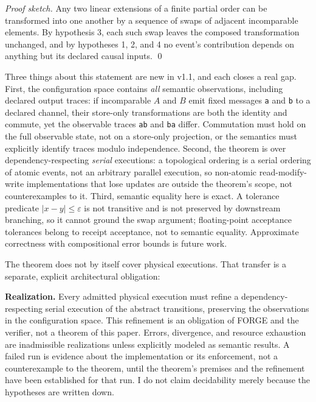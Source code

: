 \documentclass[11pt]{article}
\begin{document}
\textit{Proof sketch.} Any two linear extensions of a finite partial order can be transformed into one another by a sequence of swaps of adjacent incomparable elements. By hypothesis 3, each such swap leaves the composed transformation unchanged, and by hypotheses 1, 2, and 4 no event's contribution depends on anything but its declared causal inputs. \qed

Three things about this statement are new in v1.1, and each closes a real gap. First, the configuration space contains \textit{all} semantic observations, including declared output traces: if incomparable $A$ and $B$ emit fixed messages \texttt{a} and \texttt{b} to a declared channel, their store-only transformations are both the identity and commute, yet the observable traces \texttt{ab} and \texttt{ba} differ. Commutation must hold on the full observable state, not on a store-only projection, or the semantics must explicitly identify traces modulo independence. Second, the theorem is over dependency-respecting \textit{serial} executions: a topological ordering is a serial ordering of atomic events, not an arbitrary parallel execution, so non-atomic read-modify-write implementations that lose updates are outside the theorem's scope, not counterexamples to it. Third, semantic equality here is exact. A tolerance predicate $|x - y| \le \varepsilon$ is not transitive and is not preserved by downstream branching, so it cannot ground the swap argument; floating-point acceptance tolerances belong to receipt acceptance, not to semantic equality. Approximate correctness with compositional error bounds is future work.

The theorem does not by itself cover physical executions. That transfer is a separate, explicit architectural obligation:

\textbf{Realization.} Every admitted physical execution must refine a dependency-respecting serial execution of the abstract transitions, preserving the observations in the configuration space. This refinement is an obligation of FORGE and the verifier, not a theorem of this paper. Errors, divergence, and resource exhaustion are inadmissible realizations unless explicitly modeled as semantic results. A failed run is evidence about the implementation or its enforcement, not a counterexample to the theorem, until the theorem's premises and the refinement have been established for that run. I do not claim decidability merely because the hypotheses are written down.
\end{document}
